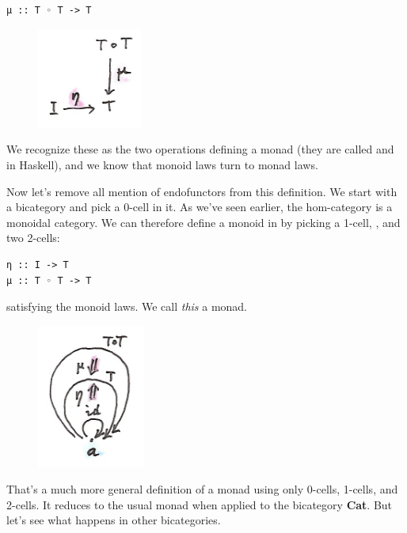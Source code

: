 \begin{Verbatim}[commandchars=\\\{\}]
μ :: T ◦ T -> T
\end{Verbatim}

\begin{figure}[H]
\centering
\includegraphics[width=1.35417in]{images/monad.png}
\end{figure}

\noindent
We recognize these as the two operations defining a monad (they are
called  and  in Haskell), and we know that
monoid laws turn to monad laws.

Now let's remove all mention of endofunctors from this definition. We
start with a bicategory  and pick a 0-cell  in it.
As we've seen earlier, the hom-category  is a monoidal
category. We can therefore define a monoid in  by
picking a 1-cell, , and two 2-cells:

\begin{Verbatim}[commandchars=\\\{\}]
η :: I -> T
μ :: T ◦ T -> T
\end{Verbatim}
satisfying the monoid laws. We call \emph{this} a monad.

\begin{figure}[H]
\centering
\includegraphics[width=1.39583in]{images/bimonad.png}
\end{figure}

\noindent
That's a much more general definition of a monad using only 0-cells,
1-cells, and 2-cells. It reduces to the usual monad when applied to the
bicategory \textbf{Cat}. But let's see what happens in other
bicategories.

